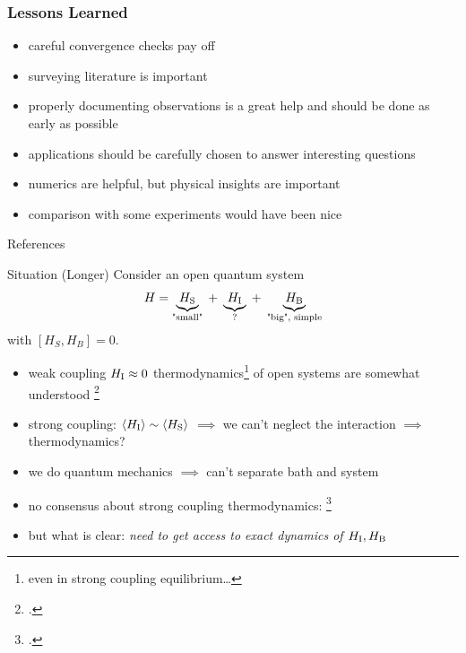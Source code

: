 \documentclass[10pt, aspectratio=169]{beamer}
\begin{document}
\begin{frame}
  \frametitle{Lessons Learned}
  \begin{itemize}
  \item careful convergence checks pay off
  \item surveying literature is important
  \item properly documenting observations is a great help
    and should be done as early as possible
  \item applications should be carefully chosen to answer interesting
    questions
  \item numerics are helpful, but physical insights are important
  \item comparison with some experiments would have been nice
  \end{itemize}
\end{frame}

\appendix
\begin{frame}[allowframebreaks]{References}
  \printbibliography
\end{frame}

\begin{frame}
  \begin{block}{Situation (Longer)}
    Consider an open quantum system
    \begin{equation}
      \label{eq:openthermo}
      H=\underbrace{H_{\mathrm{S}}}_{\text{"small"}}\; +\;
      \underbrace{H_{\mathrm{I}}}_{\mathrm{?}} \;+\;
      \underbrace{H_{\mathrm{B}}}_{\text{"big", simple}}
    \end{equation}
    with \([H_S, H_B] = 0\).
  \end{block}
  \pause
  \begin{itemize}[<+->]
  \item weak coupling \(H_{\mathrm{I}}\approx 0\)
    thermodynamics\footnote{even in strong coupling equilibrium\ldots{}} of open systems
    are somewhat understood \footcite{Rivas2019Oct,Talkner2020Oct}
  \item strong coupling: \(\ev{H_\inter} \sim \ev{H_\sys}\)
    \(\implies\) we can't neglect the interaction \(\implies\)
    thermodynamics?
  \item we do quantum mechanics \(\implies\) can't separate bath
    and system
  \item no consensus about strong coupling thermodynamics:
    \footcite{Rivas2019Oct,Talkner2020Oct,Motz2018Nov,Wiedmann2020Mar,Senior2020Feb,Kato2015Aug,Kato2016Dec,Strasberg2021Aug,Talkner2016Aug,Bera2021Feb,Bera2021Jun,Esposito2015Dec}
  \item but what is clear: \emph{need to get access to exact dynamics
      of \(H_{\mathrm{I}},H_{\mathrm{B}}\)}
  \end{itemize}
\end{frame}
\end{document}
